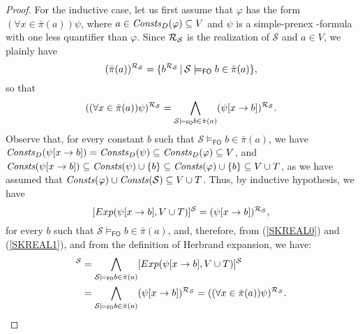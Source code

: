 \documentclass[a4paper]{llncs}
\newcommand{\HExp}{Exp}
\newcommand{\nonpairssym}{\bar{\pi}}
\newcommand{\nonpairs}[1]{\nonpairssym(#1)}
\newcommand{\atset}{\mathcal{S}}
\newcommand{\DomConsts}{\Consts_D}
\newcommand{\consta}{a}
\newcommand{\constb}{b}
\newcommand{\subst}[3]{#1[#2\rightarrow#3]}
\newcommand{\fomodels}[2]{#1 \models_{\mathsf{FO}} #2}
\begin{document}
\begin{proof}
For the inductive case, let us first assume that $\varphi$ has the 
form $(\forall x \in \nonpairs{\consta})\psi$, where $a \in 
\DomConsts(\varphi) \subseteq V$ and $\psi$ is a simple-prenex 
\Forallpizero-formula with one less quantifier than $\varphi$.
%
Since $\Realization_{\!\atset}$ is the realization of $\atset$ and $a 
\in V$, we plainly have
\begin{equation}\label{SKREAL0}
(\nonpairs{\consta})^{\Realization_{\!\atset}} = \{ 
\constb^{\Realization_{\!\atset}} \,|\,
\fomodels{\atset}{\constb \in \nonpairs{\consta}} \},
\end{equation}
so that
\begin{equation}\label{SKREAL1}
((\forall x \in \nonpairs{\consta})\psi)^{\Realization_{\!\atset}} = 
\bigwedge\limits_{\fomodels{\atset}{\constb \in \nonpairs{\consta}}} 
(\subst{\psi}{x}{\constb})^{\Realization_{\!\atset}}.
\end{equation}
%
Observe that, for every constant $\constb$ such that
$\fomodels{\atset}{\constb \in \nonpairs{\consta}}$, we have
$\DomConsts(\subst{\psi}{x}{\constb}) = \DomConsts(\psi) \subseteq
\DomConsts(\varphi) \subseteq V$, and
$\Consts(\subst{\psi}{x}{\constb}) \subseteq \Consts(\psi) \cup \{\constb\}
\subseteq \Consts(\varphi) \cup \{\constb\} \subseteq V \cup T$, as
we have assumed that $\Consts(\varphi) \cup \Consts(\atset) \subseteq 
V \cup T$.
Thus, by inductive hypothesis, we have
\[
   [\HExp(\subst{\psi}{x}{\constb}, V \cup T)]^{\atset} = 
(\subst{\psi}{x}{\constb})^{\Realization_{\!\atset}} ,
\]
for every $\constb$ such that $\fomodels{\atset}{\constb \in 
\nonpairs{\consta}}$, and, therefore, from (\ref{SKREAL0}) and 
(\ref{SKREAL1}), and from the definition of Herbrand expansion, we 
have:
\begin{align*}
  [\HExp((\forall x \in \nonpairs{\consta})\psi, V \cup T)]^{\atset} &=
  \bigwedge\limits_{\fomodels{\atset}{\constb \in 
\nonpairs{\consta}}}[\HExp(\subst{\psi}{x}{\constb}, V \cup 
T)]^{\atset}  \\
&=  \bigwedge\limits_{\fomodels{\atset}{\constb \in 
\nonpairs{\consta}}} 
(\subst{\psi}{x}{\constb})^{\Realization_{\!\atset}} =
   ((\forall x \in \nonpairs{\consta})\psi)^{\Realization_{\!\atset}} .
\end{align*}


\end{proof}
\end{document}
